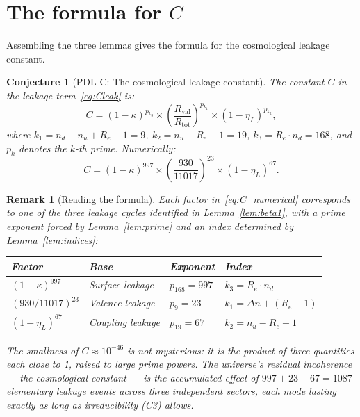 \documentclass[12pt,a4paper]{article}
\newtheorem{remark}[theorem]{Remark}
\newtheorem{conjecture}[theorem]{Conjecture}
\newcommand{\Rtot}{R_{\mathrm{tot}}}
\newcommand{\Rval}{R_{\mathrm{val}}}
\renewcommand{\Re}{R_e}
\newcommand{\kap}{\kappa}
\newcommand{\etaL}{\eta_L}
\newcommand{\Dn}{\Delta n}
\newcommand{\pk}[1]{p_{#1}}
\begin{document}
\section{The formula for \texorpdfstring{$C$}{C}}
\label{sec:formula}

Assembling the three lemmas gives the formula for the cosmological leakage constant.

\begin{conjecture}[PDL-C: The cosmological leakage constant]
\label{conj:C}
The constant $C$ in the leakage term~\eqref{eq:Cleak} is:
\begin{equation}
\boxed{C = (1-\kap)^{\pk{k_3}} \times \left(\frac{\Rval}{\Rtot}\right)^{\pk{k_1}} \times (1-\etaL)^{\pk{k_2}},}
\label{eq:C_formula}
\end{equation}
where $k_1 = n_d - n_u + \Re - 1 = 9$, $k_2 = n_u - \Re + 1 = 19$, $k_3 = \Re \cdot n_d = 168$, and $\pk{k}$ denotes the $k$-th prime. Numerically:
\begin{equation}
C = (1-\kap)^{997} \times \left(\frac{930}{11017}\right)^{23} \times (1-\etaL)^{67}.
\label{eq:C_numerical}
\end{equation}
\end{conjecture}

\begin{remark}[Reading the formula]
Each factor in~\eqref{eq:C_numerical} corresponds to one of the three leakage cycles identified in Lemma~\ref{lem:beta1}, with a prime exponent forced by Lemma~\ref{lem:prime} and an index determined by Lemma~\ref{lem:indices}:
\begin{center}
\renewcommand{\arraystretch}{1.4}
\begin{tabular}{llll}
\toprule
Factor & Base & Exponent & Index \\
\midrule
$(1-\kap)^{997}$ & Surface leakage & $\pk{168} = 997$ & $k_3 = \Re \cdot n_d$ \\
$(930/11017)^{23}$ & Valence leakage & $\pk{9} = 23$ & $k_1 = \Dn + (\Re-1)$ \\
$(1-\etaL)^{67}$ & Coupling leakage & $\pk{19} = 67$ & $k_2 = n_u - \Re + 1$ \\
\bottomrule
\end{tabular}
\end{center}
The smallness of $C \approx 10^{-46}$ is not mysterious: it is the product of three quantities each close to 1, raised to large prime powers. The universe's residual incoherence — the cosmological constant — is the accumulated effect of $997 + 23 + 67 = 1087$ elementary leakage events across three independent sectors, each mode lasting exactly as long as irreducibility (C3) allows.
\end{remark}
\end{document}
